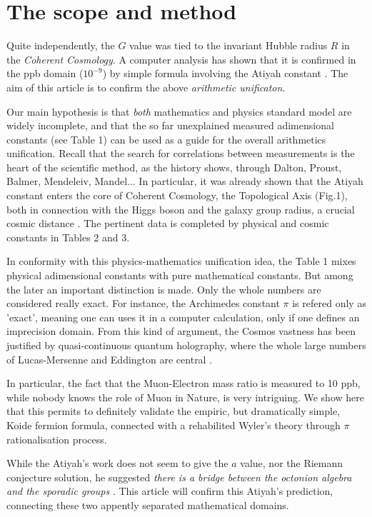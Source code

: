 \documentclass[a4paper,9pt]{article}
\begin{document}
\section{The scope and method}
   Quite independently, the $G$ value was tied to the invariant Hubble radius $R$ in the \textit {Coherent Cosmology}. A computer analysis has shown that it is confirmed in the ppb domain ($10^{-9}$) by simple formula involving the Atiyah constant \cite{Sanchez}. The aim of this article is to confirm the above \textit {arithmetic unificaton}.
   
   Our main hypothesis is that \textit{both} mathematics and physics standard model are widely incomplete, and that the so far unexplained measured adimensional constants (see Table 1) can be used as a guide for the overall arithmetics unification. Recall that the search for correlations between measurements is the heart of the scientific method, as the history shows, through Dalton, Proust, Balmer, Mendeleiv, Mandel... In particular, it was already shown that the Atiyah constant enters the core of Coherent Cosmology, the Topological Axis (Fig.1), both in connection with the Higgs boson and the galaxy group radius, a crucial cosmic distance \cite{Sanchez}. The pertinent data is completed by physical and cosmic constants in Tables 2 and 3.
   
   
   In conformity with this physics-mathematics unification idea, the Table 1 mixes physical adimensional constants \cite{Tanabashi} with pure mathematical constants. But among the later an important distinction is made. Only the whole numbers are considered really exact. For instance, the Archimedes constant $\pi$ is refered only as 'exact', meaning one can uses it in a computer calculation, only if one defines an imprecision domain. From this kind of argument, the Cosmos vastness has been justified by quasi-continuous quantum holography, where the whole large numbers of Lucas-Mersenne \cite{Bastin} and Eddington \cite{Eddington} are central \cite{Sanchez}.
      
      
   In particular, the fact that the Muon-Electron mass ratio is measured to 10 ppb, while nobody knows the role of Muon in Nature, is very intriguing. We show here that this permits to definitely validate the empiric, but dramatically simple, Koide fermion formula, connected with a rehabilited Wyler's theory through $\pi$ rationalisation process. 
   
   
   While the Atiyah's work does not seem to give the $a$ value, nor the Riemann conjecture solution, he suggested \textit{there is a bridge between the octonion algebra and the sporadic groups} \cite{Atiyah1}. This article will confirm this Atiyah's prediction, connecting these two appently separated mathematical domains.
   
\end{document}
